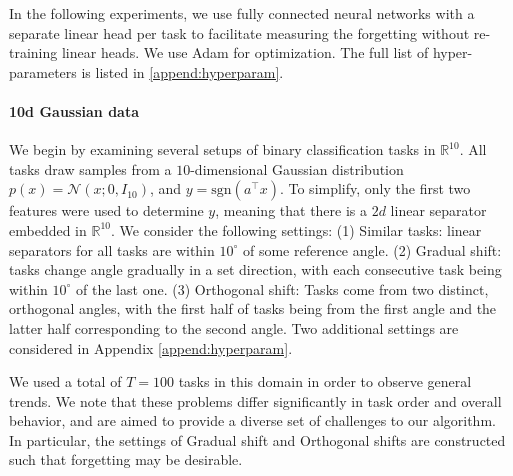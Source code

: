 \documentclass{article}
\theoremstyle{plain}
\theoremstyle{definition}
\theoremstyle{remark}
\begin{document}
In the following experiments, we use fully connected neural networks with a separate linear head per task to facilitate measuring the forgetting without re-training linear heads. We use Adam \citep{KingmaB14} for optimization. The full list of hyper-parameters is listed in \ref{append:hyperparam}. 
%
\paragraph{10d Gaussian data} 
We begin by examining several setups of binary classification tasks in $\mathbb{R}^{10}$. All tasks draw samples from a $10$-dimensional Gaussian distribution $p(x) = \mathcal{N}(x;0,I_{10})$, and $y=\mathrm{sgn}(a^\top x)$. To simplify, only the first two features were used to determine $y$, meaning that there is a $2d$ linear separator embedded in $\mathbb{R}^{10}$.
We consider the following settings:
(1) Similar tasks: linear separators for all tasks are within $10^\circ$ of some reference angle.
    (2) Gradual shift: tasks change angle gradually in a set direction, with each consecutive task being within $10^\circ$ of the last one.
    (3) Orthogonal shift: Tasks come from two distinct, orthogonal angles, with the first half of tasks being from the first angle and the latter half corresponding to the second angle. Two additional settings are considered in Appendix \ref{append:hyperparam}. 

We used a total of $T=100$ tasks in this domain in order to observe general trends.
We note that these problems differ significantly in task order and overall behavior, and are aimed to provide a diverse set of challenges to our algorithm.  %
%
In particular, the settings of Gradual shift and Orthogonal shifts are constructed such that forgetting may be desirable. %
\end{document}
